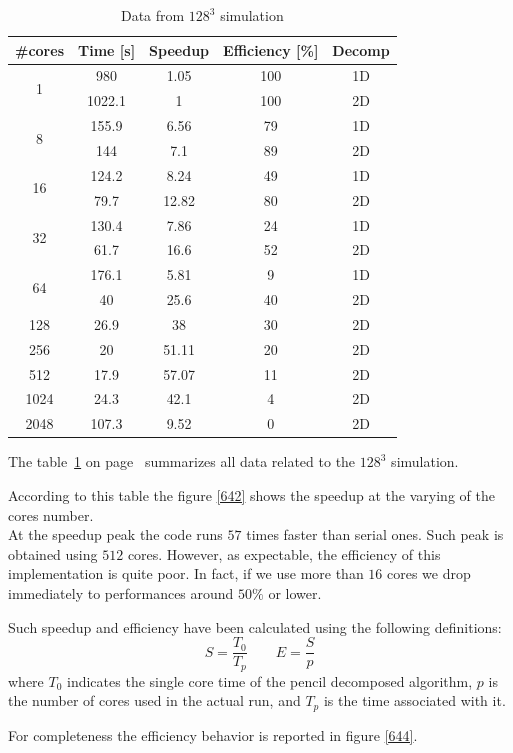 \begin{table}[h]
\caption{Data from $128^{3}$ simulation}
\begin{center}
\begin{tabular}{c c c c c}
\toprule
\textbf{\#cores} & \textbf{Time [s]} & \textbf{Speedup} & \textbf{Efficiency [\%]} & \textbf{Decomp}\\
\midrule
\multirow{2}{*}{1} & 980 & 1.05 & 100 & 1D\\
& 1022.1 & 1 & 100 & 2D \\
\hline
\multirow{2}{*}{8} & 155.9 & 6.56 & 79 & 1D\\
& 144 & 7.1 & 89 & 2D\\
\hline
\multirow{2}{*}{16} & 124.2 & 8.24 & 49 & 1D\\
& 79.7 & 12.82 & 80 & 2D\\
\hline
\multirow{2}{*}{32} & 130.4 & 7.86 & 24 & 1D\\
& 61.7 & 16.6 & 52 & 2D\\
\hline
\multirow{2}{*}{64} & 176.1 & 5.81 & 9 & 1D\\
& 40 & 25.6 & 40 & 2D\\
\hline
128 & 26.9 & 38 & 30 & 2D\\

256 & 20 & 51.11 & 20 & 2D\\

512 & 17.9 & 57.07 & 11 & 2D\\

1024 & 24.3 & 42.1 & 4 & 2D\\

2048 & 107.3 & 9.52 & 0 & 2D\\
\bottomrule
\end{tabular}
\end{center}
\label{64data}
\end{table}%


The table~\ref{64data} on page~\pageref{64data} summarizes all data related to the $128^{3}$ simulation. 


\par
According to this table the figure \ref{642} shows the speedup at the varying of the cores number. \\
At the speedup peak the code runs $57$ times faster than serial ones. Such peak is obtained using $512$ cores. However, as expectable, the efficiency of this implementation is quite poor. In fact, if we use more than $16$ cores we drop immediately to performances around $50\%$ or lower. 
\par
Such speedup and efficiency have been calculated using the following definitions:
\[
S = \frac{T_{0}}{T_{p}} \quad \quad E = \frac{S}{p}
\]
where $T_{0}$ indicates the single core time of the pencil decomposed algorithm, $p$ is the number of cores used in the actual run, and $T_{p}$ is the time associated with it. \\
\par
For completeness the efficiency behavior is reported in figure \ref{644}.

